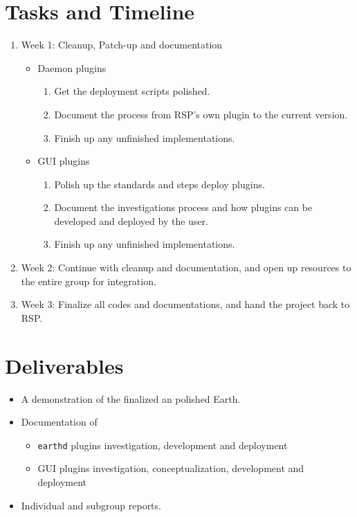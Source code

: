 \documentclass{article}
\begin{document}
\section*{Tasks and Timeline}

\begin{enumerate}
    \item Week 1: Cleanup, Patch-up and documentation
        \begin{itemize}
            \item Daemon plugins
                \begin{enumerate}
                    \item Get the deployment scripts polished. 
                    \item Document the process from RSP's own plugin to the current version. 
                    \item Finish up any unfinished implementations.
                \end{enumerate}
            \item GUI plugins
                \begin{enumerate}
                    \item Polish up the standards and steps deploy plugins. 
                    \item Document the investigations process and how plugins can be developed and deployed by the user. 
                    \item Finish up any unfinished implementations. 
                \end{enumerate}
        \end{itemize}
    \item Week 2: Continue with cleanup and documentation, and open up resources to the entire group for integration. 
    \item Week 3: Finalize all codes and documentations, and hand the project back to RSP.
\end{enumerate}

\section*{Deliverables}

\begin{itemize}
    \item A demonstration of the finalized an polished Earth. 
    \item Documentation of
        \begin{itemize}
            \item \texttt{earthd} plugins investigation, development and deployment
            \item GUI plugins investigation, conceptualization, development and deployment
        \end{itemize}
    \item Individual and subgroup reports.
\end{itemize}
\end{document}
